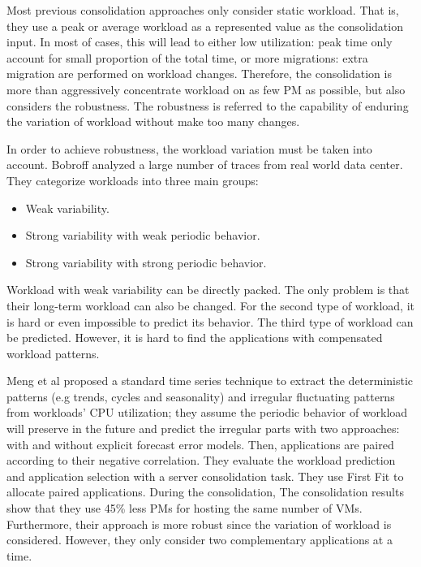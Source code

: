 Most previous consolidation approaches \cite{Viswanathan:2012ej, Chen:2011fl,Feller:2011vs} only consider static workload. That is, they use a peak or average workload as a represented value as the consolidation input. In most of cases, this will lead to either low utilization: peak time only account for small proportion of the total time, or more migrations: extra migration are performed on workload changes. 
Therefore, the consolidation is more than aggressively concentrate workload on as few PM as possible, but also considers the robustness. The robustness is referred to the capability of enduring the variation of workload without make too many changes.

In order to achieve robustness, the workload variation must be taken into account. Bobroff \cite{Bobroff:2007ec} analyzed a large number of traces from real world data center. They categorize workloads into three main groups: 

\begin{itemize}
	\item Weak variability.
	\item Strong variability with weak periodic behavior.
	\item Strong variability with strong periodic behavior.
\end{itemize}
Workload with weak variability can be directly packed. The only problem is that their long-term workload can also be changed. 
For the second type of workload, it is hard or even impossible to predict its behavior. The third type of workload can be predicted. However, it is hard to find the applications with compensated workload patterns. 

Meng et al \cite{Meng:2010gh} proposed a standard time series technique to extract the deterministic patterns (e.g trends, cycles and seasonality) and irregular fluctuating patterns from workloads' CPU utilization; they assume the periodic behavior of workload will preserve in the future and predict the irregular parts with two approaches: with and without explicit forecast error models. Then, applications are paired according to their negative correlation. They evaluate the workload prediction and application selection with a server consolidation task. They use First Fit to allocate paired applications. During the consolidation, The consolidation results show that they use 45\% less PMs for hosting the same number of VMs. Furthermore, their approach is more robust since the variation of workload is considered. However, they only consider two complementary applications at a time. 

